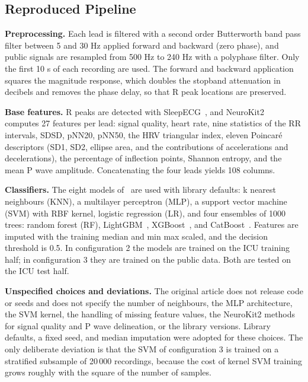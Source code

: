 \documentclass[conference,a4paper]{IEEEtran}
\begin{document}
\subsection{Reproduced Pipeline}

\noindent\textbf{Preprocessing.} Each lead is filtered with a second order Butterworth band pass filter between 5 and 30 Hz applied forward and backward (zero phase), and public signals are resampled from 500 Hz to 240 Hz with a polyphase filter. Only the first 10 s of each recording are used. The forward and backward application squares the magnitude response, which doubles the stopband attenuation in decibels and removes the phase delay, so that R peak locations are preserved.

\noindent\textbf{Base features.} R peaks are detected with SleepECG~\cite{sleepecg}, and NeuroKit2~\cite{makowski2021} computes 27 features per lead: signal quality, heart rate, nine statistics of the RR intervals, SDSD, pNN20, pNN50, the HRV triangular index, eleven Poincaré descriptors (SD1, SD2, ellipse area, and the contributions of accelerations and decelerations), the percentage of inflection points, Shannon entropy, and the mean P wave amplitude. Concatenating the four leads yields 108 columns.

\noindent\textbf{Classifiers.} The eight models of~\cite{nassar2025} are used with library defaults: k nearest neighbours (KNN), a multilayer perceptron (MLP), a support vector machine (SVM) with RBF kernel, logistic regression (LR), and four ensembles of 1000 trees: random forest (RF), LightGBM~\cite{ke2017}, XGBoost~\cite{chen2016}, and CatBoost~\cite{prokhorenkova2018}. Features are imputed with the training median and min max scaled, and the decision threshold is 0.5. In configuration 2 the models are trained on the ICU training half; in configuration 3 they are trained on the public data. Both are tested on the ICU test half.

\noindent\textbf{Unspecified choices and deviations.} The original article does not release code or seeds and does not specify the number of neighbours, the MLP architecture, the SVM kernel, the handling of missing feature values, the NeuroKit2 methods for signal quality and P wave delineation, or the library versions. Library defaults, a fixed seed, and median imputation were adopted for these choices. The only deliberate deviation is that the SVM of configuration 3 is trained on a stratified subsample of 20\,000 recordings, because the cost of kernel SVM training grows roughly with the square of the number of samples.
\end{document}
